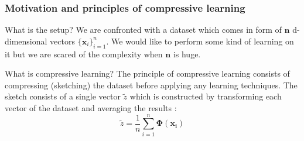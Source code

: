 	\begin{frame}
		\frametitle{Motivation and principles of compressive learning}
		
		\begin{block}{What is the setup?}
			We are confronted with a dataset which comes in form of $\boldsymbol{n}$ d-dimensional vectors {$\{\boldsymbol{x}_{i}\}_{i = 1}^{n}$}. We would like to perform some kind of learning on it but we are scared of the complexity when $\boldsymbol{n}$ is huge.
			
		\end{block}
		
		\begin{block}{What is compressive learning?}
			The principle of compressive learning consists of compressing (sketching) the dataset before applying any learning techniques. The sketch consists of a single vector $\tilde{z}$ which is constructed by transforming each vector of the dataset and averaging the results :
			$$
			\tilde{z} = \frac{1}{n}\sum_{i = 1}^{n} \boldsymbol{\Phi(x_{i})}
			$$
		\end{block}
	\end{frame}
	
